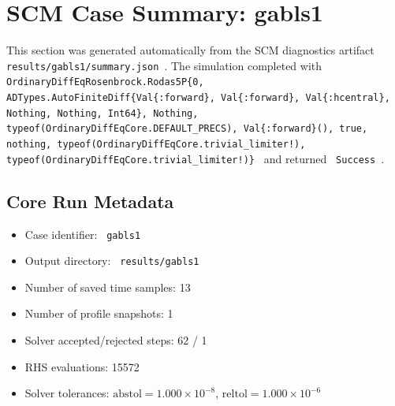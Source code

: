 \section{SCM Case Summary: gabls1}
\label{sec:scm_case_gabls1_gabls1_80x2m_0h_report}

This section was generated automatically from the SCM diagnostics artifact
\texttt{ results/gabls1/summary.json }. The simulation completed with \texttt{ OrdinaryDiffEqRosenbrock.Rodas5P\{0, ADTypes.AutoFiniteDiff\{Val\{:forward\}, Val\{:forward\}, Val\{:hcentral\}, Nothing, Nothing, Int64\}, Nothing, typeof(OrdinaryDiffEqCore.DEFAULT\_PRECS), Val\{:forward\}(), true, nothing, typeof(OrdinaryDiffEqCore.trivial\_limiter!), typeof(OrdinaryDiffEqCore.trivial\_limiter!)\} }
and returned \texttt{ Success }.

\subsection{Core Run Metadata}
\begin{itemize}
  \item Case identifier: \texttt{ gabls1 }
  \item Output directory: \texttt{ results/gabls1 }
  \item Number of saved time samples: 13
  \item Number of profile snapshots: 1
  \item Solver accepted/rejected steps: 62 / 1
  \item RHS evaluations: 15572
  \item Solver tolerances: $\mathrm{abstol}=1.000 \times 10^{-8}$, $\mathrm{reltol}=1.000 \times 10^{-6}$
\end{itemize}

